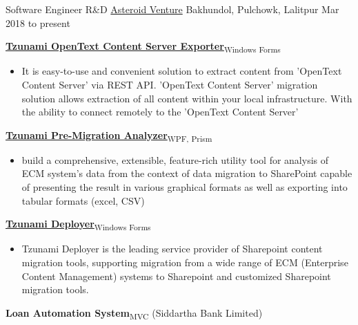 

\begin{cventries}
\cventry
{Software Engineer R\&D} %
{\href{https://asteroidventure.com/}{Asteroid Venture}} %
{Bakhundol, Pulchowk, Lalitpur} %
{Mar 2018 to present} %
{
\begin{cvitems} %
		\item {\textbf{\href{https://tzunami.com/opentext-content-server/}{Tzunami OpenText Content Server Exporter}}\textsubscript{Windows Forms}}
		\begin{itemize}
			\item {It is easy-to-use and convenient solution to extract content from 'OpenText Content Server' via REST API. 'OpenText Content Server' migration solution allows extraction of all content within your local infrastructure. With the ability to connect remotely to the 'OpenText Content Server'}
		\end{itemize}
		\item {\textbf{\href{https://tzunami.com/pre-migration-analysis/}{Tzunami Pre-Migration Analyzer}}\textsubscript{WPF, Prism}}
		\begin{itemize}
			\item {build a comprehensive, extensible, feature-rich utility tool for analysis of ECM system's data from the context of data migration to SharePoint capable of presenting the result in various graphical formats as well as exporting into tabular formats (excel, CSV)}
		\end{itemize}
		\item {\textbf{\href{https://tzunami.com/}{Tzunami Deployer}}\textsubscript{Windows Forms}}
		\begin{itemize}
			\item {Tzunami Deployer is the leading service provider of Sharepoint content migration tools, supporting migration from a wide range of ECM (Enterprise Content Management) systems to Sharepoint and customized Sharepoint migration tools.}
		\end{itemize}
		\item {\textbf{Loan Automation System}\textsubscript{MVC} (Siddartha Bank Limited)}

\end{cvitems}}
\end{cventries}
